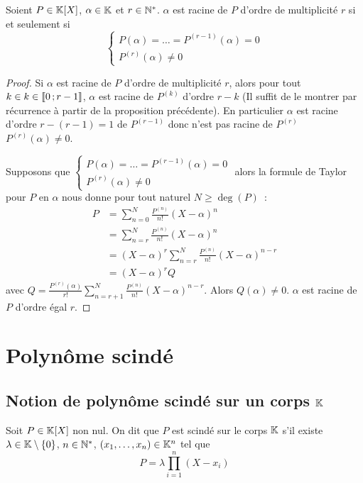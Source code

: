 \begin{prop}
  Soient $P \in \mathbb{K}[X]$, $\alpha \in \mathbb{K}$ et $r \in \mathbb{N}^*$. $\alpha$ est racine de $P$ d'ordre de multiplicité $r$ si et seulement si
  \begin{equation}
    \begin{cases}
      P(\alpha) = \ldots = P^{(r-1)}(\alpha)=0 \\
      P^{(r)}(\alpha) \neq 0
    \end{cases}
  \end{equation}
\end{prop}
\begin{proof}
  Si $\alpha$ est racine de $P$ d'ordre de multiplicité $r$, alors pour tout $k \in k \in \mathopen{\llbracket}0\mathclose{}\mathpunct{};r-1\mathclose{\rrbracket}$, $\alpha$ est racine de $P^{(k)}$ d'ordre $r-k$ (Il suffit de le montrer par récurrence à partir de la proposition précédente). En particulier $\alpha$ est racine d'ordre $r-(r-1)=1$ de $P^{(r-1)}$ donc n'est pas racine de $P^{(r)}$ $P^{(r)}(\alpha) \neq 0$.
  
  Supposons que $\begin{cases}
      P(\alpha) = \ldots = P^{(r-1)}(\alpha)=0 \\
      P^{(r)}(\alpha) \neq 0
    \end{cases}$
    alors la formule de Taylor pour $P$ en $\alpha$ nous donne pour tout naturel $N \geq \deg(P)$~:
    \begin{align}
      P &= \sum_{n=0}^N \frac{P^{(n)}}{n!} (X-\alpha)^n \\
      &= \sum_{n=r}^N \frac{P^{(n)}}{n!} (X-\alpha)^n \\
      &= (X-\alpha)^r \sum_{n=r}^N \frac{P^{(n)}}{n!} (X-\alpha)^{n-r}\\
      &= (X-\alpha)^r Q
    \end{align}
    avec $Q = \frac{P^{(r)}(\alpha)}{r!} \sum_{n=r+1}^N \frac{P^{(n)}}{n!} (X-\alpha)^{n-r}$. Alors $Q(\alpha) \neq 0$. $\alpha$ est racine de $P$ d'ordre égal $r$.
\end{proof}

\section{Polynôme scindé}

\subsection{Notion de polynôme scindé sur un corps $\mathbb{K}$}

\begin{defdef}
  Soit $P \in \mathbb{K}[X]$ non nul. On dit que $P$ est scindé sur le corps $\mathbb{K}$ s'il existe $\lambda \in \mathbb{K}\setminus\{0\}$, $n \in \mathbb{N}^*$, $(x_1, \ldots, x_n) \in \mathbb{K}^n$ tel que
  \begin{equation}
    P = \lambda \prod_{i=1}^n (X-x_i)
  \end{equation}
\end{defdef}

